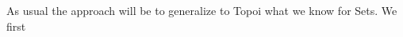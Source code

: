 

As usual the approach will be to generalize to Topoi what we know for Sets. \newline
We first 

%
%
%
%
%
